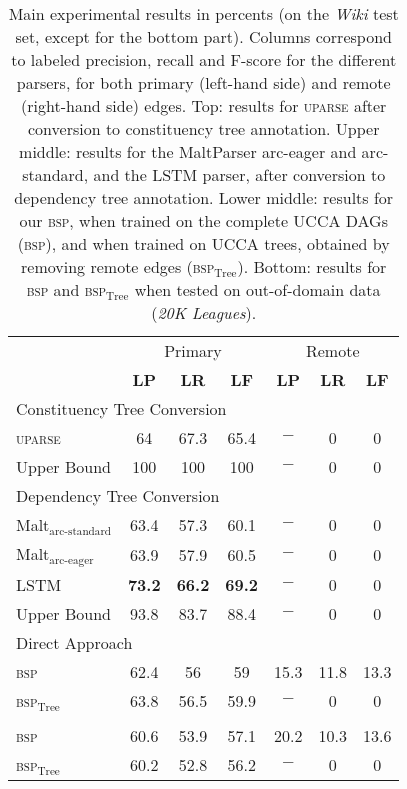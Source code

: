 \documentclass[11pt]{article}
\begin{document}
\begin{table}[ht!]
  \centering
\begin{tabular}{l|ccc|ccc}
& \multicolumn{3}{c|}{Primary} & \multicolumn{3}{c}{Remote} \\
& \textbf{LP} & \textbf{LR} & \textbf{LF} & \textbf{LP} & \textbf{LR} & \textbf{LF} \\
\hline
\multicolumn{4}{l}{\rule{0pt}{2ex} \footnotesize Constituency Tree Conversion} \\
\textsc{uparse} & 64 & 67.3 & 65.4 & $-$ & 0 & 0 \\
Upper Bound & 100 & 100 & 100 & $-$ & 0 & 0 \\
\hline
\multicolumn{4}{l}{\rule{0pt}{4ex} \footnotesize Dependency Tree Conversion} \\
Malt$_{\textrm{arc-standard}}$ & 63.4 & 57.3 & 60.1 & $-$ & 0 & 0 \\
Malt$_{\textrm{arc-eager}}$ & 63.9 & 57.9 & 60.5 & $-$ & 0 & 0 \\
LSTM & {\bf 73.2} & {\bf 66.2} & {\bf 69.2} & $-$ & 0 & 0 \\
Upper Bound & 93.8 & 83.7 & 88.4 & $-$ & 0 & 0 \\
\hline
\multicolumn{4}{l}{\rule{0pt}{4ex} \footnotesize Direct Approach} \\
\textsc{bsp} & 62.4 & 56 & 59 & 15.3 & 11.8 & 13.3 \\
\textsc{bsp}$_{\mathrm{Tree}}$ & 63.8 & 56.5 & 59.9 & $-$ & 0 & 0 \\
\hhline{=======}
\multicolumn{4}{l}{\rule{0pt}{4ex} \footnotesize Out-of-domain} \\
\textsc{bsp} & 60.6 & 53.9 & 57.1 & 20.2 & 10.3 & 13.6 \\
\textsc{bsp}$_{\mathrm{Tree}}$ & 60.2 & 52.8 & 56.2 & $-$ & 0 & 0 \\
\end{tabular}
\caption{
  Main experimental results in percents (on the \textit{Wiki} test set, except for the bottom part). Columns correspond to labeled precision,
  recall and F-score for the different parsers, for both primary (left-hand side)
  and remote (right-hand side) edges. Top: results for \textsc{uparse}
  after conversion to constituency tree annotation. Upper middle: results for the
  MaltParser arc-eager and arc-standard, and
  the LSTM parser, after conversion to dependency tree annotation.
  Lower middle: results for our \textsc{bsp}, when trained on the complete UCCA DAGs (\textsc{bsp}),
  and when trained on UCCA trees, obtained by removing remote edges (\textsc{bsp}$_{\mathrm{Tree}}$).
  Bottom: results for \textsc{bsp} and \textsc{bsp}$_{\mathrm{Tree}}$ when tested on out-of-domain data (\textit{20K Leagues}).
}
\label{table:results}
\end{table}
\end{document}
